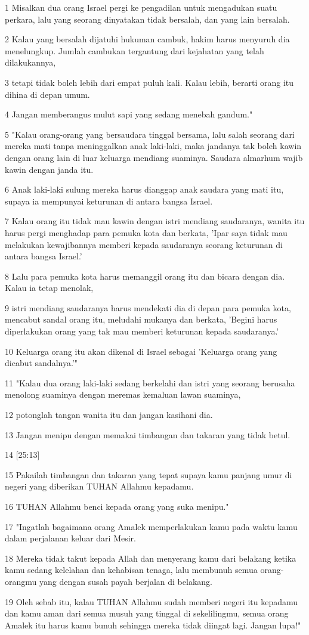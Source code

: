 \par 1 Misalkan dua orang Israel pergi ke pengadilan untuk mengadukan suatu perkara, lalu yang seorang dinyatakan tidak bersalah, dan yang lain bersalah.
\par 2 Kalau yang bersalah dijatuhi hukuman cambuk, hakim harus menyuruh dia menelungkup. Jumlah cambukan tergantung dari kejahatan yang telah dilakukannya,
\par 3 tetapi tidak boleh lebih dari empat puluh kali. Kalau lebih, berarti orang itu dihina di depan umum.
\par 4 Jangan memberangus mulut sapi yang sedang menebah gandum."
\par 5 "Kalau orang-orang yang bersaudara tinggal bersama, lalu salah seorang dari mereka mati tanpa meninggalkan anak laki-laki, maka jandanya tak boleh kawin dengan orang lain di luar keluarga mendiang suaminya. Saudara almarhum wajib kawin dengan janda itu.
\par 6 Anak laki-laki sulung mereka harus dianggap anak saudara yang mati itu, supaya ia mempunyai keturunan di antara bangsa Israel.
\par 7 Kalau orang itu tidak mau kawin dengan istri mendiang saudaranya, wanita itu harus pergi menghadap para pemuka kota dan berkata, 'Ipar saya tidak mau melakukan kewajibannya memberi kepada saudaranya seorang keturunan di antara bangsa Israel.'
\par 8 Lalu para pemuka kota harus memanggil orang itu dan bicara dengan dia. Kalau ia tetap menolak,
\par 9 istri mendiang saudaranya harus mendekati dia di depan para pemuka kota, mencabut sandal orang itu, meludahi mukanya dan berkata, 'Begini harus diperlakukan orang yang tak mau memberi keturunan kepada saudaranya.'
\par 10 Keluarga orang itu akan dikenal di Israel sebagai 'Keluarga orang yang dicabut sandalnya.'"
\par 11 "Kalau dua orang laki-laki sedang berkelahi dan istri yang seorang berusaha menolong suaminya dengan meremas kemaluan lawan suaminya,
\par 12 potonglah tangan wanita itu dan jangan kasihani dia.
\par 13 Jangan menipu dengan memakai timbangan dan takaran yang tidak betul.
\par 14 [25:13]
\par 15 Pakailah timbangan dan takaran yang tepat supaya kamu panjang umur di negeri yang diberikan TUHAN Allahmu kepadamu.
\par 16 TUHAN Allahmu benci kepada orang yang suka menipu."
\par 17 "Ingatlah bagaimana orang Amalek memperlakukan kamu pada waktu kamu dalam perjalanan keluar dari Mesir.
\par 18 Mereka tidak takut kepada Allah dan menyerang kamu dari belakang ketika kamu sedang kelelahan dan kehabisan tenaga, lalu membunuh semua orang-orangmu yang dengan susah payah berjalan di belakang.
\par 19 Oleh sebab itu, kalau TUHAN Allahmu sudah memberi negeri itu kepadamu dan kamu aman dari semua musuh yang tinggal di sekelilingmu, semua orang Amalek itu harus kamu bunuh sehingga mereka tidak diingat lagi. Jangan lupa!"

